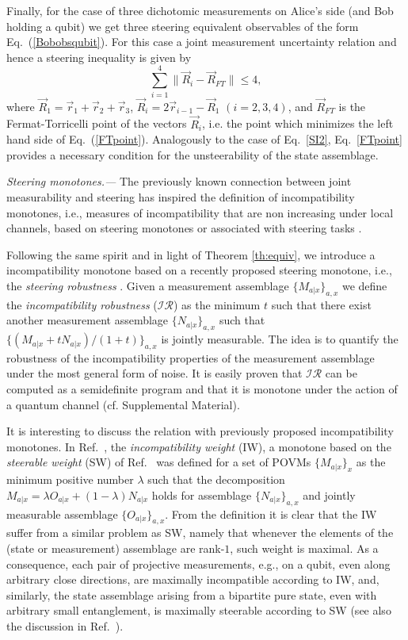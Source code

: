 \documentclass[10pt,twocolumn,aps,prl,nobibnotes,showpacs,superscriptaddress,floatfix]{revtex4-1}
\theoremstyle{definition}
\begin{document}
Finally, for the case of three dichotomic measurements on Alice's side (and Bob holding a qubit) we get three steering equivalent observables of the form Eq.~(\ref{Bobobsqubit}). For this case a joint measurement uncertainty relation and hence a steering inequality is given by \cite{YuOh13}
\begin{equation}\label{FTpoint}
\sum_{i=1}^4\|\vec R_i-\vec R_{FT}\|\leq 4,
\end{equation}
where $\vec R_1=\vec r_1+\vec r_2+\vec r_3$, $\vec R_i=2\vec r_{i-1}-\vec R_1$ $(i=2,3,4)$, and $\vec R_{FT}$ is the Fermat-Torricelli point of the vectors $\vec R_i$, i.e. the point which minimizes the left hand side of Eq.~(\ref{FTpoint}). Analogously to the case of Eq.~\eqref{SI2}, Eq.~\eqref{FTpoint} provides 
a necessary condition for the unsteerability of the state assemblage. 




{\it Steering monotones.---} The previously known connection between joint measurability and steering \cite{Uola14,Quint14} has inspired the definition of incompatibility monotones, i.e., measures of incompatibility that are non increasing under local channels, based on steering monotones \cite{Pusey15} or associated with steering tasks \cite{Heinosaari15}.

Following the same spirit and in light of Theorem \ref{th:equiv},  we introduce a incompatibility monotone based on a recently proposed steering monotone, i.e., the {\it steering robustness} \cite{Piani15}. Given a measurement assemblage $\{ M_{a|x} \}_{a,x}$ we define the {\it incompatibility robustness} ($\mathcal{IR}$) as the minimum $t$ such that there exist another measurement assemblage $\{ N_{a|x} \}_{a,x}$ such that $\{ (M_{a|x} + t N_{a|x})/(1+t) \}_{a,x}$ is jointly measurable. The idea is to quantify the robustness of the incompatibility properties of the measurement assemblage under the most general form of noise. It is easily proven that $\mathcal{IR}$ can be computed as a semidefinite program and that it is monotone under the action of a quantum channel (cf. Supplemental Material).  

It is interesting to discuss the relation with previously proposed incompatibility monotones. In Ref.~\cite{Pusey15}, the {\it incompatibility weight} (IW), a monotone based on the {\it steerable weight} (SW) of Ref.~\cite{SNC14} was defined for a set of POVMs $\{M_{a|x}\}_x$ as the minimum positive number $\lambda$ such that the decomposition  $M_{a|x}=\lambda O_{a|x} + (1-\lambda) N_{a|x}$ holds for assemblage $\{N_{a|x}\}_{a,x}$ and jointly measurable assemblage $\{O_{a|x}\}_{a,x}$. From the definition it is clear that the IW suffer from a similar problem as SW, namely that whenever the elements of the (state or measurement) assemblage are rank-$1$, such weight is maximal. As a consequence, each pair of projective measurements, e.g., on a qubit, even along arbitrary close directions, are maximally incompatible according to IW, and, similarly, the state assemblage arising from a bipartite pure state, even with arbitrary small entanglement, is maximally steerable according to SW (see also the discussion in 
Ref.~\cite{Piani15}).
\end{document}
